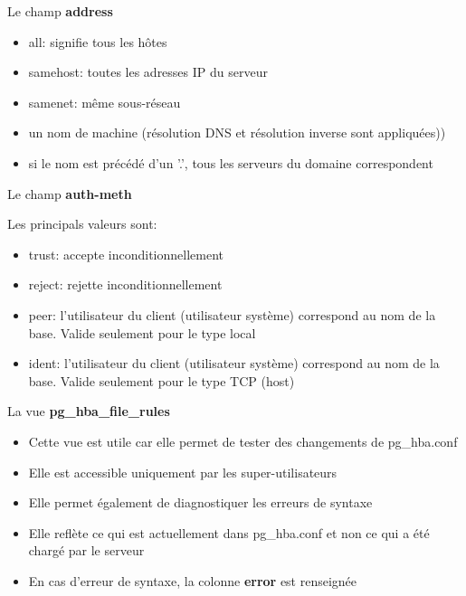 \begin{frame}[fragile]{Le champ \textbf{address}}

   \begin{itemize}
      \item all: signifie tous les hôtes
      \item samehost: toutes les adresses IP du serveur
      \item samenet: même sous-réseau
      \item un nom de machine (résolution DNS et résolution inverse sont appliquées))
      \item si le nom est précédé d'un '.', tous les serveurs du domaine correspondent
   \end{itemize}

\end{frame}


\begin{frame}[fragile]{Le champ \textbf{auth-meth}}

   Les principals valeurs sont:
   \begin{itemize}
      \item trust: accepte inconditionnellement
      \item reject: rejette inconditionnellement
      \item peer: l'utilisateur du client (utilisateur système) correspond au nom de la base. Valide seulement pour le type local
      \item ident: l'utilisateur du client (utilisateur système) correspond au nom de la base. Valide seulement pour le type TCP (host)
   \end{itemize}

\end{frame}


\begin{frame}[fragile]{La vue \textbf{pg\_hba\_file\_rules}}

   \begin{itemize}
      \item Cette vue est utile car elle permet de tester des changements de pg\_hba.conf
      \item Elle est accessible uniquement par les super-utilisateurs
      \item Elle permet également de diagnostiquer les erreurs de syntaxe
      \item Elle reflète ce qui est actuellement dans pg\_hba.conf et non ce qui a été chargé par le serveur
      \item En cas d'erreur de syntaxe, la colonne \textbf{error} est renseignée
   \end{itemize}
   
\begin{toile}
\end{toile}

\end{frame}

